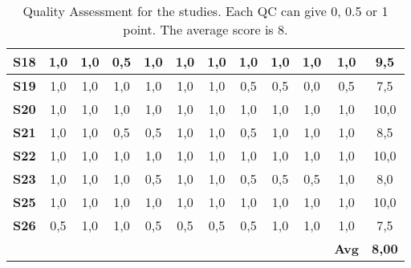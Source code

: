 \begin{table}
\begin{tabular}{|c|c|c|c|c|c|c|c|c|c|c||c|}
    \textbf{S18} & 1,0 & 1,0 & 0,5 & 1,0 & 1,0 & 1,0 & 1,0 & 1,0 & 1,0 & 1,0 & 9,5 \\ \hline
    \textbf{S19} & 1,0 & 1,0 & 1,0 & 1,0 & 1,0 & 1,0 & 0,5 & 0,5 & 0,0 & 0,5 & 7,5 \\ \hline
    \textbf{S20} & 1,0 & 1,0 & 1,0 & 1,0 & 1,0 & 1,0 & 1,0 & 1,0 & 1,0 & 1,0 & 10,0 \\ \hline
    \textbf{S21} & 1,0 & 1,0 & 0,5 & 0,5 & 1,0 & 1,0 & 0,5 & 1,0 & 1,0 & 1,0 & 8,5 \\ \hline
    \textbf{S22} & 1,0 & 1,0 & 1,0 & 1,0 & 1,0 & 1,0 & 1,0 & 1,0 & 1,0 & 1,0 & 10,0 \\ \hline
    \textbf{S23} & 1,0 & 1,0 & 1,0 & 0,5 & 1,0 & 1,0 & 0,5 & 0,5 & 0,5 & 1,0 & 8,0 \\ \hline
    \textbf{S25} & 1,0 & 1,0 & 1,0 & 1,0 & 1,0 & 1,0 & 1,0 & 1,0 & 1,0 & 1,0 & 10,0 \\ \hline
    \textbf{S26} & 0,5 & 1,0 & 1,0 & 0,5 & 0,5 & 0,5 & 0,5 & 1,0 & 1,0 & 1,0 & 7,5 \\ \hline
     &  &  &  &  &  &  &  &  &  & \textbf{Avg} & \textbf{8,00} \\ \hline
    
    \end{tabular}
    
    \caption{Quality Assessment for the studies. Each QC can give 0, 0.5 or 1 point. The average score is 8.}
    \label{tab:quality}
\end{table}